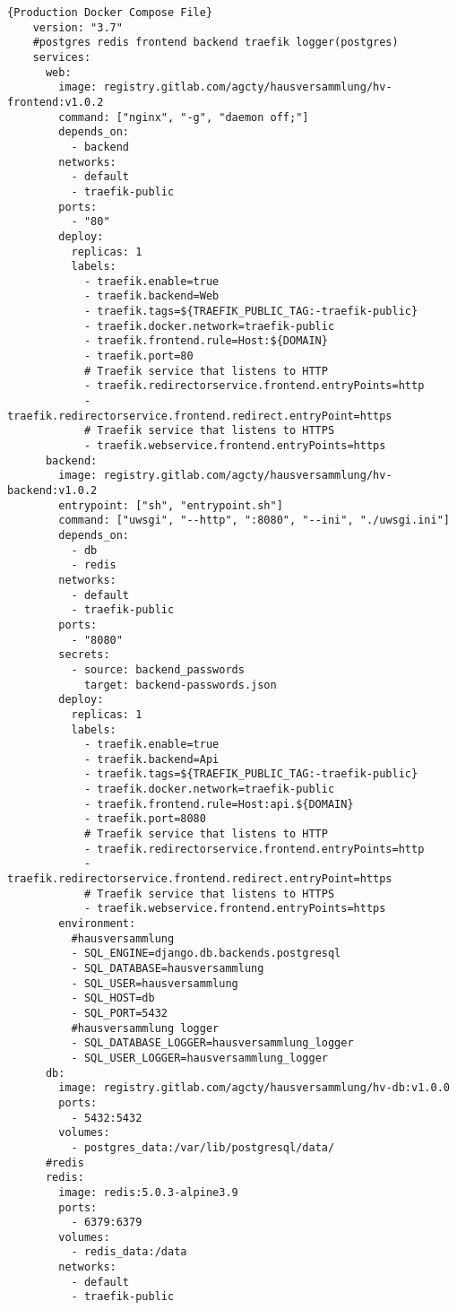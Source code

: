   \begin{lstlisting}[caption=Production Docker Compose File, captionpos=b, style=htmlcssjs, label=dockerprod]{Production Docker Compose File}
    version: "3.7"
    #postgres redis frontend backend traefik logger(postgres)
    services:
      web:
        image: registry.gitlab.com/agcty/hausversammlung/hv-frontend:v1.0.2
        command: ["nginx", "-g", "daemon off;"]
        depends_on:
          - backend
        networks:
          - default
          - traefik-public
        ports:
          - "80"
        deploy:
          replicas: 1
          labels:
            - traefik.enable=true
            - traefik.backend=Web
            - traefik.tags=${TRAEFIK_PUBLIC_TAG:-traefik-public}
            - traefik.docker.network=traefik-public
            - traefik.frontend.rule=Host:${DOMAIN}
            - traefik.port=80
            # Traefik service that listens to HTTP
            - traefik.redirectorservice.frontend.entryPoints=http
            - traefik.redirectorservice.frontend.redirect.entryPoint=https
            # Traefik service that listens to HTTPS
            - traefik.webservice.frontend.entryPoints=https
      backend:
        image: registry.gitlab.com/agcty/hausversammlung/hv-backend:v1.0.2
        entrypoint: ["sh", "entrypoint.sh"]
        command: ["uwsgi", "--http", ":8080", "--ini", "./uwsgi.ini"]
        depends_on:
          - db
          - redis
        networks:
          - default
          - traefik-public
        ports:
          - "8080"
        secrets:
          - source: backend_passwords
            target: backend-passwords.json
        deploy:
          replicas: 1
          labels:
            - traefik.enable=true
            - traefik.backend=Api
            - traefik.tags=${TRAEFIK_PUBLIC_TAG:-traefik-public}
            - traefik.docker.network=traefik-public
            - traefik.frontend.rule=Host:api.${DOMAIN}
            - traefik.port=8080
            # Traefik service that listens to HTTP
            - traefik.redirectorservice.frontend.entryPoints=http
            - traefik.redirectorservice.frontend.redirect.entryPoint=https
            # Traefik service that listens to HTTPS
            - traefik.webservice.frontend.entryPoints=https
        environment:
          #hausversammlung
          - SQL_ENGINE=django.db.backends.postgresql
          - SQL_DATABASE=hausversammlung
          - SQL_USER=hausversammlung
          - SQL_HOST=db
          - SQL_PORT=5432
          #hausversammlung logger
          - SQL_DATABASE_LOGGER=hausversammlung_logger
          - SQL_USER_LOGGER=hausversammlung_logger
      db: 
        image: registry.gitlab.com/agcty/hausversammlung/hv-db:v1.0.0
        ports:
          - 5432:5432
        volumes:
          - postgres_data:/var/lib/postgresql/data/
      #redis
      redis:
        image: redis:5.0.3-alpine3.9
        ports:
          - 6379:6379
        volumes:
          - redis_data:/data
        networks:
          - default
          - traefik-public
    

\end{lstlisting}
